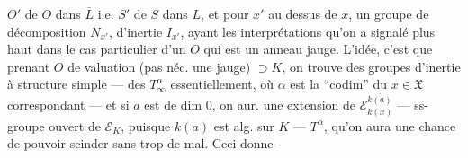 $O'$ de $O$ dans $\overline L$ i.e. $S'$ de $S$ dans $L$, et pour $x'$ au dessus de $x$, un groupe de décomposition $N_{x'}$, d'inertie $I_{x'}$, ayant les interprétations qu'on a signalé plus haut dans le cas particulier d'un $O$ qui est un anneau jauge. L'idée, c'est que prenant $O$ de valuation (pas néc. une jauge) $\supset K$, on trouve des groupes d'inertie à structure simple ---
des $T_\infty^\alpha$ essentiellement, où $\alpha$ est la ``codim'' du $x\in\mathfrak X$ correspondant --- et si $a$ est de dim $0$, on aur. une extension de $\mathcal E_{k(x)}^{\overline{k(a)}}$ --- ss-groupe ouvert de $\mathcal E_K$, puisque
$k(a)$ est  alg. sur $K$ ---  $T^\alpha$, qu'on aura une chance de pouvoir scinder sans trop de mal. Ceci donne-
